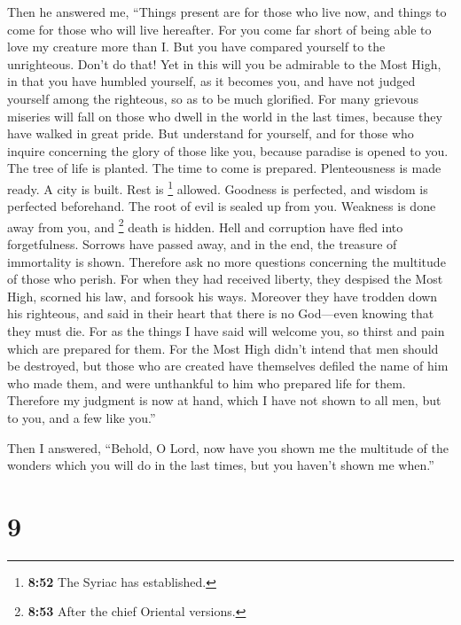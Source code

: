  Then he answered me, ``Things present are for those who
live now, and things to come for those who will live hereafter.
 For you come far short of being able to love my creature
more than I. But you have compared yourself to the unrighteous. Don't do
that!  Yet in this will you be admirable to the Most
High,  in that you have humbled yourself, as it becomes
you, and have not judged yourself among the righteous, so as to be much
glorified.  For many grievous miseries will fall on those
who dwell in the world in the last times, because they have walked in
great pride.  But understand for yourself, and for those
who inquire concerning the glory of those like you, 
because paradise is opened to you. The tree of life is planted. The time
to come is prepared. Plenteousness is made ready. A city is built. Rest
is \footnote{\textbf{8:52} The Syriac has established.} allowed.
Goodness is perfected, and wisdom is perfected beforehand.
 The root of evil is sealed up from you. Weakness is done
away from you, and \footnote{\textbf{8:53} After the chief Oriental
  versions.} death is hidden. Hell and corruption have fled into
forgetfulness.  Sorrows have passed away, and in the end,
the treasure of immortality is shown.  Therefore ask no
more questions concerning the multitude of those who perish.
 For when they had received liberty, they despised the
Most High, scorned his law, and forsook his ways. 
Moreover they have trodden down his righteous,  and said
in their heart that there is no God---even knowing that they must die.
 For as the things I have said will welcome you, so
thirst and pain which are prepared for them. For the Most High didn't
intend that men should be destroyed,  but those who are
created have themselves defiled the name of him who made them, and were
unthankful to him who prepared life for them.  Therefore
my judgment is now at hand,  which I have not shown to
all men, but to you, and a few like you.''

Then I answered,  ``Behold, O Lord, now have you shown me
the multitude of the wonders which you will do in the last times, but
you haven't shown me when.''

\hypertarget{section-8}{%
\section{9}\label{section-8}}

